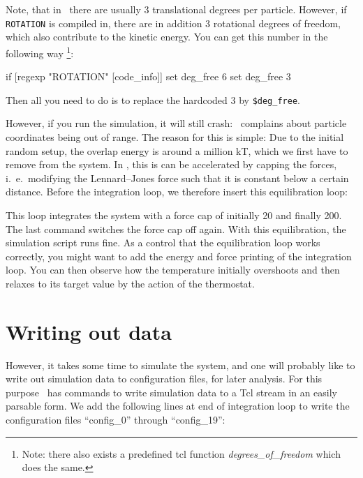 \documentclass[
a4paper,                        %
11pt,                           %
twoside,                        %
footsepline,                    %
headsepline,                    %
headexclude,                    %
footexclude,                    %
pagesize,                       %
]{scrartcl}
\begin{document}
Note, that in \es\ there are usually 3 translational degrees per
particle. However, if \verb|ROTATION| is compiled in, there are in
addition 3 rotational degrees of freedom, which also contribute to the
kinetic energy.  You can get this number in the following way
\footnote{Note: there also exists a predefined tcl function {\it
    degrees\_of\_freedom} which does the same.}:

\begin{tclcode}
  if { [regexp "ROTATION" [code_info]] } {
    set deg_free 6
  } {
    set deg_free 3
  }
\end{tclcode}

Then all you need to do is to replace the hardcoded 3 by \verb|$deg_free|.

However, if you run the simulation, it will still
crash: \es\ complains about particle coordinates being out of range.
The reason for this is simple: Due to the initial random setup, the
overlap energy is around a million kT, which we first have to remove
from the system. In \es, this is can be accelerated by capping the
forces, i.~e.\ modifying the Lennard--Jones force such that it is
constant below a certain distance. Before the integration loop, we
therefore insert this equilibration loop:


This loop integrates the system with a force cap of initially 20 and
finally 200.  The last command switches the force cap off again. With
this equilibration, the simulation script runs fine. As a control
that the equilibration loop works correctly, you might want to add the
energy and force printing of the integration loop. You can then
observe how the temperature initially overshoots and then relaxes to
its target value by the action of the thermostat.

\section{Writing out data}

However, it takes some time to simulate the system, and one will
probably like to write out simulation data to configuration files, for
later analysis. For this purpose \es\ has commands to write simulation
data to a Tcl stream in an easily parsable form.  We add the following
lines at end of integration loop to write the configuration files
``config\_0'' through ``config\_19'':
\end{document}
